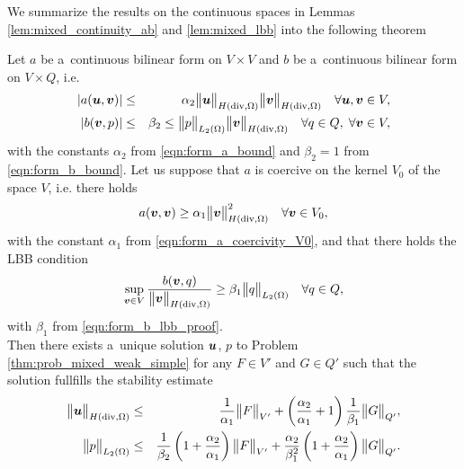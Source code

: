 We summarize the results on the continuous spaces in Lemmas \ref{lem:mixed_continuity_ab} and \ref{lem:mixed_lbb} into the following theorem
\begin{theorem} \label{thm:brezzi_theorem}
Let $a$ be a~continuous bilinear form on $V\times V$ and $b$ be a~continuous bilinear form on $V\times Q$, i.e.
\begin{eqnarray}
    \left|a(\mathbf{\boldsymbol{u}},\mathbf{\boldsymbol{v}})\right| &\leq& \alpha_2 \bigl\Vert\mathbf{\boldsymbol{u}}\bigr\Vert_{H({\rm div},\Omega)} \bigl\Vert\mathbf{\boldsymbol{v}}\bigr\Vert_{H({\rm div},\Omega)} \quad \forall \mathbf{\boldsymbol{u}},\mathbf{\boldsymbol{v}}\in V,\\
    \left|b(\mathbf{\boldsymbol{v}},p)\right| &\leq& \beta_2 \leq \bigl\Vert p\bigr\Vert_{L_2(\Omega)} \bigl\Vert\mathbf{\boldsymbol{v}}\bigr\Vert_{H({\rm div},\Omega)} \quad \forall q\in Q,\;\forall \mathbf{\boldsymbol{v}}\in V,
\end{eqnarray}
with the constants $\alpha_2$ from \eqref{eqn:form_a_bound} and $\beta_2=1$ from \eqref{eqn:form_b_bound}.
Let us suppose that $a$ is coercive on the kernel $V_0$ of the space $V$, i.e. there holds
\begin{equation}
    a(\mathbf{\boldsymbol{v}},\mathbf{\boldsymbol{v}}) \geq \alpha_1 \bigl\Vert\mathbf{\boldsymbol{v}}\bigr\Vert^2_{H({\rm div},\Omega)} \quad \forall \mathbf{\boldsymbol{v}}\in V_0,
\end{equation}
with the constant $\alpha_1$ from \eqref{eqn:form_a_coercivity_V0},
and that there holds the LBB condition
\begin{equation}
    \sup_{\mathbf{\boldsymbol{v}}\in V} \frac{b(\mathbf{\boldsymbol{v}},q)}{\bigl\Vert\mathbf{\boldsymbol{v}}\bigr\Vert_{H({\rm div},\Omega)}} \geq \beta_1\bigl\Vert q\bigr\Vert_{L_2(\Omega)} \quad \forall q\in Q,
\end{equation}
with $\beta_1$ from \eqref{eqn:form_b_lbb_proof}.\\
Then there exists a~unique solution $\mathbf{\boldsymbol{u}}$, $p$ to Problem \eqref{thm:prob_mixed_weak_simple} for any $F\in V'$ and $G\in Q'$
such that the solution fullfills the stability estimate
\begin{eqnarray}
    \bigl\Vert\mathbf{\boldsymbol{u}}\bigr\Vert_{H({\rm div},\Omega)} &\leq& \frac{1}{\alpha_1} \bigl\Vert F\bigr\Vert_{V'} + \left( \frac{\alpha_2}{\alpha_1} + 1\right)\frac{1}{\beta_1} \bigl\Vert G\bigr\Vert_{Q'},\\
    \bigl\Vert p\bigr\Vert_{L_2(\Omega)} &\leq& \frac{1}{\beta_2} \left(1+ \frac{\alpha_2}{\alpha_1} \right) \bigl\Vert F\bigr\Vert_{V'}
            + \frac{\alpha_2}{\beta_1^2} \left( 1+ \frac{\alpha_2}{\alpha_1}\right) \bigl\Vert G\bigr\Vert_{Q'}.
\end{eqnarray}
\end{theorem}
